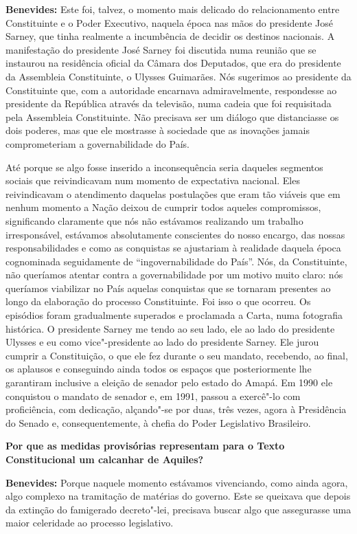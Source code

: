 \textbf{Benevides:} Este foi, talvez, o momento mais delicado do
relacionamento entre Constituinte e o Poder Executivo, naquela época nas
mãos do presidente José Sarney, que tinha realmente a incumbência de
decidir os destinos nacionais. A manifestação do presidente José Sarney
foi discutida numa reunião que se instaurou na residência oficial da
Câmara dos Deputados, que era do presidente da Assembleia Constituinte,
o Ulysses Guimarães. Nós sugerimos ao presidente da Constituinte que,
com a autoridade encarnava admiravelmente, respondesse ao presidente da
República através da televisão, numa cadeia que foi requisitada pela
Assembleia Constituinte. Não precisava ser um diálogo que distanciasse
os dois poderes, mas que ele mostrasse à sociedade que as inovações
jamais comprometeriam a governabilidade do País.

Até porque se algo fosse inserido a inconsequência seria daqueles
segmentos sociais que reivindicavam num momento de expectativa nacional.
Eles reivindicavam o atendimento daquelas postulações que eram tão
viáveis que em nenhum momento a Nação deixou de cumprir todos aqueles
compromissos, significando claramente que nós não estávamos realizando
um trabalho irresponsável, estávamos absolutamente conscientes do nosso
encargo, das nossas responsabilidades e como as conquistas se ajustariam
à realidade daquela época cognominada seguidamente de
``ingovernabilidade do País''. Nós, da Constituinte, não queríamos
atentar contra a governabilidade por um motivo muito claro: nós
queríamos viabilizar no País aquelas conquistas que se tornaram
presentes ao longo da elaboração do processo Constituinte. Foi isso o
que ocorreu. Os episódios foram gradualmente superados e proclamada a
Carta, numa fotografia histórica. O presidente Sarney me tendo ao seu
lado, ele ao lado do presidente Ulysses e eu como vice"-presidente ao
lado do presidente Sarney. Ele jurou cumprir a Constituição, o que ele
fez durante o seu mandato, recebendo, ao final, os aplausos e
conseguindo ainda todos os espaços que posteriormente lhe garantiram
inclusive a eleição de senador pelo estado do Amapá. Em 1990 ele
conquistou o mandato de senador e, em 1991, passou a exercê"-lo com
proficiência, com dedicação, alçando"-se por duas, três vezes, agora à
Presidência do Senado e, consequentemente, à chefia do Poder Legislativo
Brasileiro.

\textbf{Por que as medidas provisórias representam para o Texto
Constitucional um calcanhar de Aquiles?}

\textbf{Benevides:} Porque naquele momento estávamos vivenciando, como
ainda agora, algo complexo na tramitação de matérias do governo. Este se
queixava que depois da extinção do famigerado decreto"-lei, precisava
buscar algo que assegurasse uma maior celeridade ao processo
legislativo.

